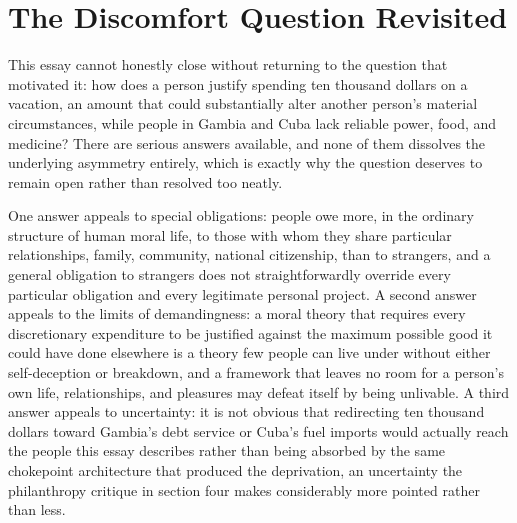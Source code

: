 \documentclass[11pt]{article}
\begin{document}
\section{The Discomfort Question Revisited}

This essay cannot honestly close without returning to the question that motivated it: how does a person justify spending ten thousand dollars on a vacation, an amount that could substantially alter another person's material circumstances, while people in Gambia and Cuba lack reliable power, food, and medicine? There are serious answers available, and none of them dissolves the underlying asymmetry entirely, which is exactly why the question deserves to remain open rather than resolved too neatly.

One answer appeals to special obligations: people owe more, in the ordinary structure of human moral life, to those with whom they share particular relationships, family, community, national citizenship, than to strangers, and a general obligation to strangers does not straightforwardly override every particular obligation and every legitimate personal project. A second answer appeals to the limits of demandingness: a moral theory that requires every discretionary expenditure to be justified against the maximum possible good it could have done elsewhere is a theory few people can live under without either self-deception or breakdown, and a framework that leaves no room for a person's own life, relationships, and pleasures may defeat itself by being unlivable. A third answer appeals to uncertainty: it is not obvious that redirecting ten thousand dollars toward Gambia's debt service or Cuba's fuel imports would actually reach the people this essay describes rather than being absorbed by the same chokepoint architecture that produced the deprivation, an uncertainty the philanthropy critique in section four makes considerably more pointed rather than less.
\end{document}
